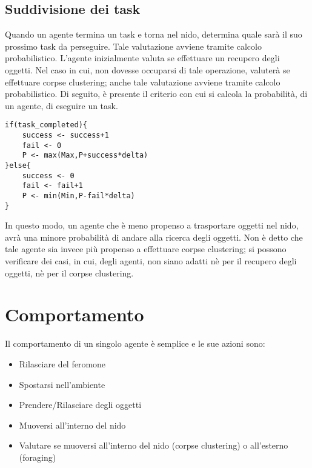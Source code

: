 \documentclass[12pt,a4paper,openright,twoside]{report}
\begin{document}
\section{Suddivisione dei task} 
Quando un agente termina un task e torna nel nido, determina quale sarà il suo prossimo task da perseguire. Tale valutazione avviene tramite calcolo probabilistico. L'agente inizialmente valuta se effettuare un recupero degli oggetti. Nel caso in cui, non dovesse occuparsi di tale operazione, valuterà se effettuare corpse clustering; anche tale valutazione avviene tramite calcolo probabilistico. Di seguito, è presente il criterio con cui si calcola la probabilità, di un agente, di eseguire un task.\\

\begin{verbatim}
if(task_completed){
    success <- success+1
    fail <- 0
    P <- max(Max,P+success*delta)
}else{
    success <- 0
    fail <- fail+1
    P <- min(Min,P-fail*delta)
}
\end{verbatim}

In questo modo, un agente che è meno propenso a trasportare oggetti nel nido, avrà una minore probabilità di andare alla ricerca degli oggetti. Non è detto che tale agente sia invece più propenso a effettuare corpse clustering; si possono verificare dei casi, in cui, degli agenti, non siano adatti nè per il recupero degli oggetti, nè per il corpse clustering.

\clearpage{\pagestyle{empty}\cleardoublepage}
\chapter{Comportamento}                %
\lhead[\fancyplain{}{\bfseries\thepage}]{\fancyplain{}{\bfseries\rightmark}}
Il comportamento di un singolo agente è semplice e le sue azioni sono:

\begin{itemize}
	\item Rilasciare del feromone
	\item Spostarsi nell'ambiente
	\item Prendere/Rilasciare degli oggetti
	\item Muoversi all'interno del nido
	\item Valutare se muoversi all'interno del nido (corpse clustering) o all'esterno (foraging)
\end{itemize}
\end{document}
